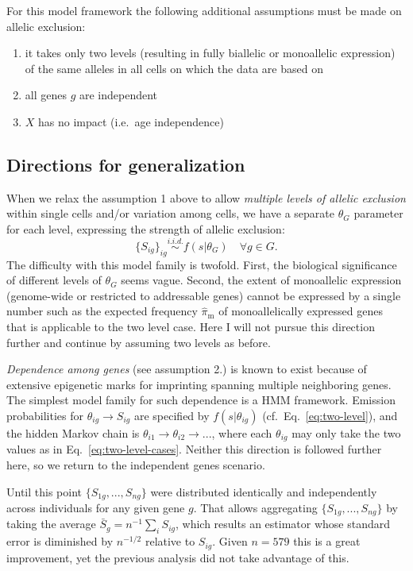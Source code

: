 \documentclass{article}
\begin{document}
For this model framework the following additional assumptions must be made on
allelic exclusion:
\begin{enumerate}
\item it takes only two levels (resulting in fully biallelic or monoallelic
expression) of the same alleles in all cells on which the data are based on
\item all genes $g$ are independent
\item $X$ has no impact (i.e.~age independence)
\end{enumerate}

\subsection{Directions for generalization}

When we relax the assumption 1 above to allow \emph{multiple levels of allelic exclusion}
within single cells and/or variation among cells, we have a separate
$\theta_G$ parameter for each level, expressing the strength of allelic
exclusion:
\begin{equation*}
\{S_{ig}\}_{ig} \overset{i.i.d.}{\sim} f(s | \theta_G) \quad \forall g \in G.
\end{equation*}
The difficulty with this model family is twofold.  First, the biological
significance of different levels of $\theta_G$ seems vague.  Second, the
extent of monoallelic expression (genome-wide or restricted to addressable
genes) cannot be expressed by a single number such as the expected
frequency $\hat{\pi}_\mathrm{m}$ of monoallelically expressed genes that is applicable
to the two level case.  Here I will not pursue this direction further and
continue by assuming two levels as before.

\emph{Dependence among genes} (see assumption 2.) is known to exist because of extensive epigenetic
marks for imprinting spanning multiple neighboring genes.  The simplest model
family for such dependence is a HMM framework.  Emission probabilities for
\(\theta_{ig}\rightarrow S_{ig}\) are specified by \(f(s | \theta_{ig})\)
(cf.~Eq.~\ref{eq:two-level}), and
the hidden Markov chain is
\(\theta_{i1}\rightarrow\theta_{i2}\rightarrow...\), where each
\(\theta_{ig}\) may only take the two values as in
Eq.~\ref{eq:two-level-cases}.  Neither this direction is followed further
here, so we return to the independent genes scenario.

Until this point \(\{S_{1g},...,S_{ng}\}\) were distributed identically and
independently across individuals for any given gene \(g\).  That allows
aggregating \(\{S_{1g},...,S_{ng}\}\) by taking the average
\(\bar{S}_g=n^{-1}\sum_i S_{ig}\), which results an estimator whose standard
error is diminished by \(n^{-1/2}\) relative to \(S_{ig}\).  Given $n=579$
this is a great improvement, yet the previous analysis did not take advantage
of this.
\end{document}
